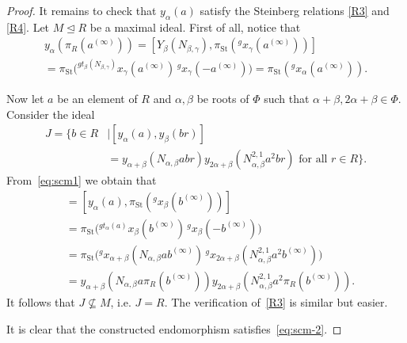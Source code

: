 \documentclass[oneside, 11pt]{amsart}
\numberwithin{equation}{section}
\theoremstyle{definition}
\theoremstyle{remark}
\DeclareMathOperator\St{St}
\newcommand{\up}[2]{{^{#1}\!{#2}}}
\begin{document}
\begin{proof}
 It remains to check that \(y_\alpha(a)\) satisfy the Steinberg relations \eqref{R3} and \eqref{R4}.
 Let \(M \trianglelefteq R\) be a maximal ideal. First of all, notice that
 \begin{multline} \label{eq:scm1}
  y_\alpha(\pi_R(a^{(\infty)})) = [Y_\beta(N_{\beta, \gamma}), \pi_{\St}(\up g{x_\gamma(a^{(\infty)})})]\\
  = \pi_{\St}\bigl(\up{g t_\beta(N_{\beta, \gamma})}{x_\gamma(a^{(\infty)})}\, \up g{x_\gamma(-a^{(\infty)})}\bigr) = \pi_{\St}(\up g{x_\alpha(a^{(\infty)})}).
 \end{multline}
 
 Now let $a$ be an element of $R$ and \(\alpha, \beta\) be roots of $\Phi$ such that \(\alpha + \beta, 2\alpha + \beta \in \Phi\). 
 Consider the ideal
 \begin{align*}
 J = \{b \in R &\mid [y_\alpha(a), y_\beta(br)] \\
 &= y_{\alpha + \beta}(N_{\alpha, \beta} abr)
 y_{2\alpha + \beta}(N_{\alpha, \beta}^{2,1} a^2 br) \text{ for all } r \in R\}.
 \end{align*}
 From~\eqref{eq:scm1} we obtain that
 \begin{align*}
 [y_\alpha(a), y_\beta(\pi_R(b^{(\infty)}))] &= [y_\alpha(a), \pi_{\St}(\up g{x_\beta(b^{(\infty)})})]\\ 
 &= \pi_{\St}\bigl(\up{g t_\alpha(a)}{x_\beta(b^{(\infty)})}\, \up g{x_\beta(-b^{(\infty)})}\bigr)\\
 &= \pi_{\St}\bigl(\up g{x_{\alpha + \beta}(N_{\alpha, \beta} a b^{(\infty)})}\, \up g{x_{2\alpha + \beta}(N_{\alpha, \beta}^{2,1} a^2 b^{(\infty)})}\bigr)\\
 &= y_{\alpha + \beta}(N_{\alpha, \beta} a \pi_R(b^{(\infty)})) y_{2\alpha + \beta}(N_{\alpha, \beta}^{2,1} a^2 \pi_R(b^{(\infty)})).
 \end{align*}
 It follows that \(J \not \subseteq M\), i.e. \(J = R\). The verification of~\eqref{R3} is similar but easier.   
 
 It is clear that the constructed endomorphism satisfies~\eqref{eq:scm-2}. \end{proof}
 
\end{document}
